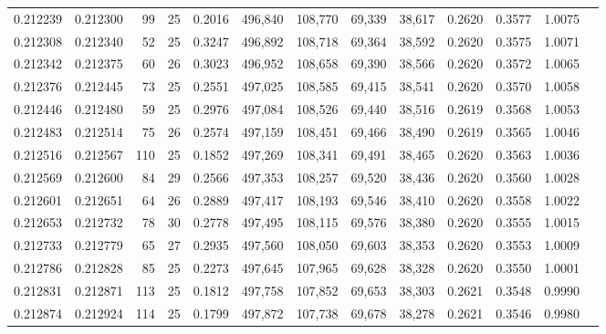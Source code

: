 \begin{tabular}{rrrrrrrrrrrrr}
0.212239 & 0.212300 &  99 &  25 &                                     0.2016 & 496,840 & 108,770 &  69,339 &  38,617 & 0.2620 & 0.3577 & 1.0075 \\
0.212308 & 0.212340 &  52 &  25 &                                     0.3247 & 496,892 & 108,718 &  69,364 &  38,592 & 0.2620 & 0.3575 & 1.0071 \\
0.212342 & 0.212375 &  60 &  26 &                                     0.3023 & 496,952 & 108,658 &  69,390 &  38,566 & 0.2620 & 0.3572 & 1.0065 \\
0.212376 & 0.212445 &  73 &  25 &                                     0.2551 & 497,025 & 108,585 &  69,415 &  38,541 & 0.2620 & 0.3570 & 1.0058 \\
0.212446 & 0.212480 &  59 &  25 &                                     0.2976 & 497,084 & 108,526 &  69,440 &  38,516 & 0.2619 & 0.3568 & 1.0053 \\
0.212483 & 0.212514 &  75 &  26 &                                     0.2574 & 497,159 & 108,451 &  69,466 &  38,490 & 0.2619 & 0.3565 & 1.0046 \\
0.212516 & 0.212567 & 110 &  25 &                                     0.1852 & 497,269 & 108,341 &  69,491 &  38,465 & 0.2620 & 0.3563 & 1.0036 \\
0.212569 & 0.212600 &  84 &  29 &                                     0.2566 & 497,353 & 108,257 &  69,520 &  38,436 & 0.2620 & 0.3560 & 1.0028 \\
0.212601 & 0.212651 &  64 &  26 &                                     0.2889 & 497,417 & 108,193 &  69,546 &  38,410 & 0.2620 & 0.3558 & 1.0022 \\
0.212653 & 0.212732 &  78 &  30 &                                     0.2778 & 497,495 & 108,115 &  69,576 &  38,380 & 0.2620 & 0.3555 & 1.0015 \\
0.212733 & 0.212779 &  65 &  27 &                                     0.2935 & 497,560 & 108,050 &  69,603 &  38,353 & 0.2620 & 0.3553 & 1.0009 \\
0.212786 & 0.212828 &  85 &  25 &                                     0.2273 & 497,645 & 107,965 &  69,628 &  38,328 & 0.2620 & 0.3550 & 1.0001 \\
0.212831 & 0.212871 & 113 &  25 &                                     0.1812 & 497,758 & 107,852 &  69,653 &  38,303 & 0.2621 & 0.3548 & 0.9990 \\
0.212874 & 0.212924 & 114 &  25 &                                     0.1799 & 497,872 & 107,738 &  69,678 &  38,278 & 0.2621 & 0.3546 & 0.9980 \\

\end{tabular}
